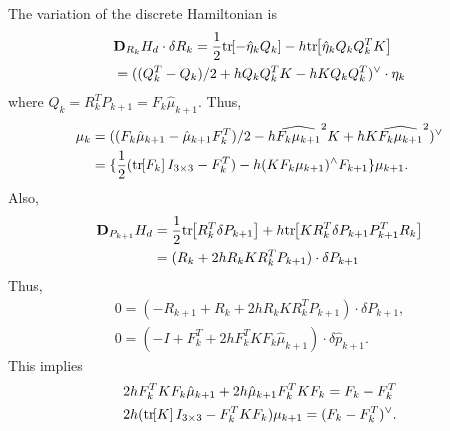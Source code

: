 \documentclass[letterpaper, 10pt, conference]{ieeeconf}
\newcommand{\bracket}[1]{\ensuremath{\left[ #1 \right]}}
\newcommand{\tr}[1]{\mbox{tr}\ensuremath{\negthickspace\bracket{#1}}}
\newcommand{\D}{\ensuremath{\mathbf{D}}}
\begin{document}
The variation of the discrete Hamiltonian is
\begin{align*}
    & \D_{R_k} H_d \cdot \delta R_k =\frac{1}{2} \tr{-\hat\eta_k Q_k} -h \tr{\hat\eta_k Q_kQ_k^T K } \\
    & = ( (Q_k^T- Q_k)/2 +h Q_kQ_k^TK  - hK Q_k Q_k^T)^\vee\cdot \eta_k
\end{align*}
where $Q_k = R_k^T P_{k+1} = F_k \hat\mu_{k+1}$.
Thus,
\begin{align*}
    \mu_k 
          & = ((F_k\hat\mu_{k+1}-\hat\mu_{k+1}F_k^T)/2 - h \widehat{F_k\mu_{k+1}}^2 K +  h K \widehat{F_k\mu_{k+1}}^2)^\vee\\
          & = \{ \frac{1}{2}(\tr{F_k}I_{3\times 3}-F_k^T) -h (KF_k\mu_{k+1})^\wedge F_{k+1}  \}  \mu_{k+1}.
\end{align*}
Also,
\begin{align*}
    \D_{P_{k+1}} H_d & = \frac{1}{2}\tr{ R_k^T \delta P_{k+1}} + h\tr{KR_k^T \delta P_{k+1} P_{k+1}^T R_k} \\
                     & = ( R_k + 2h R_k K R_k^T P_{k+1}) \cdot \delta P_{k+1}
\end{align*}
Thus, 
\begin{gather*}
0 = (- R_{k+1} +  R_k + 2h R_k K R_k^T P_{k+1}) \cdot \delta P_{k+1},\\
0 = (- I +  F_k^T + 2h F_k^T K F_k \hat\mu_{k+1}) \cdot \delta \hat p_{k+1}.
\end{gather*}
This implies
\begin{gather*}
2h F_k^T K F_k \hat\mu_{k+1} + 2h \hat\mu_{k+1} F_k^T K F_k = F_k - F_k^T\\
2h (\tr{K}I_{3\times 3} - F_k^T K F_k)\mu_{k+1} = (F_k - F_k^T)^\vee.
\end{gather*}





\end{document}

